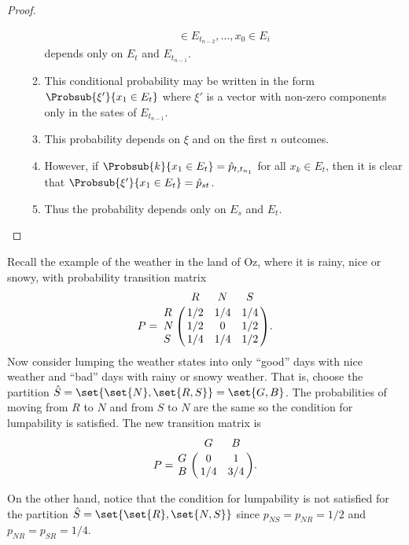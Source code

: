 \documentclass[12pt]{article}
\begin{document}
\begin{proof}
\begin{enumerate}
\begin{enumerate}
\begin{multline*}
{                        \in E_{t_{n-2}}, \dots,  x_0 \in
                        E_i}
                    \end{multline*} depends only on \( E_t \) and \( E_{t_{n-1}} \).
                \item
                    This conditional probability may be written in the
                    form \( \Probsub{\xi'}{x_1 \in E_t} \) where \( \xi'
                    \) is a vector with non-zero components only in the
                    sates of \( E_{t_{n-1}} \).
                \item
                    This probability depends on \( \xi \) and on the
                    first \( n \) outcomes.
                \item
                    However, if \( \Probsub{k}{x_1 \in E_t} = \hat{p}_{t,
                    t_{n_1}} \) for all \( x_k \in E_t \), then it is
                    clear that \( \Probsub{\xi'}{x_1 \in E_t} = \hat{p}_
                    {st} \).
                \item
                    Thus the probability depends only on \( E_s \) and \(
                    E_t \).
            \end{enumerate}
    \end{enumerate}
\end{proof}

\begin{example}
    Recall the example of the weather in the land of Oz, where it is
    rainy, nice or snowy, with probability transition matrix
    \[
        P = \bordermatrix{ & R & N & S \cr
        R & 1/2 & 1/4 & 1/4 \cr
        N & 1/2 & 0 & 1/2 \cr
        S & 1/4 & 1/4 & 1/2 }.
    \] Now consider lumping the weather states into only ``good'' days
    with nice weather and ``bad'' days with rainy or snowy weather.
    That is, choose the partition \( \hat{S} = \set{ \set{N}, \set{R,S}} =
    \set{G, B} \). The probabilities of moving from \( R \) to \( N \)
    and from \( S \) to \( N \) are the same so the condition for
    lumpability is satisfied.  The new transition matrix is
    \[
      P = \bordermatrix{
          & G   & B \cr
        G & 0   & 1 \cr
        B & 1/4 & 3/4}.
    \]

    On the other hand, notice that the condition for lumpability is not
    satisfied for the partition \( \hat{S} = \set{ \set{R}, \set{N, S}} \)
    since \( p_{N S} = p_{NR} = 1/2 \) and \( p_{NR} = p_{SR} = 1/4
    \).
  \end{example}
\end{document}
